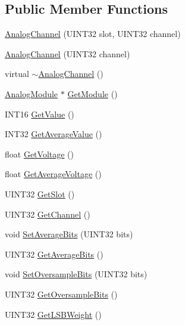 \subsection*{\-Public \-Member \-Functions}
\begin{DoxyCompactItemize}
\item 
\hyperlink{classAnalogChannel_a8e6754f11b6515e0cb61cf43c6ed9f0c}{\-Analog\-Channel} (\-U\-I\-N\-T32 slot, \-U\-I\-N\-T32 channel)
\item 
\hyperlink{classAnalogChannel_a9596b1752bb22dcb1295c2158042ec76}{\-Analog\-Channel} (\-U\-I\-N\-T32 channel)
\item 
virtual \hyperlink{classAnalogChannel_aab41f5e25b1a9a8fa1b935783dcc89a1}{$\sim$\-Analog\-Channel} ()
\item 
\hyperlink{classAnalogModule}{\-Analog\-Module} $\ast$ \hyperlink{classAnalogChannel_aa8c8f0328ba7a4074d0f8c8fe8738327}{\-Get\-Module} ()
\item 
\-I\-N\-T16 \hyperlink{classAnalogChannel_ab9d814ee9f311c6beb2b379e60aee79a}{\-Get\-Value} ()
\item 
\-I\-N\-T32 \hyperlink{classAnalogChannel_a35dda9856d45c0fe807337ab3678b212}{\-Get\-Average\-Value} ()
\item 
float \hyperlink{classAnalogChannel_a8032c882a142a01c43ea16c817fc2290}{\-Get\-Voltage} ()
\item 
float \hyperlink{classAnalogChannel_aba0ed352ce011170556c039c939f8731}{\-Get\-Average\-Voltage} ()
\item 
\-U\-I\-N\-T32 \hyperlink{classAnalogChannel_a2c2a990443b12be6cf86e9900d43b0ec}{\-Get\-Slot} ()
\item 
\-U\-I\-N\-T32 \hyperlink{classAnalogChannel_a5d191a8fb04536a9c20355e6e5b97262}{\-Get\-Channel} ()
\item 
void \hyperlink{classAnalogChannel_a64da26075ace6b51c635ed4b0646742b}{\-Set\-Average\-Bits} (\-U\-I\-N\-T32 bits)
\item 
\-U\-I\-N\-T32 \hyperlink{classAnalogChannel_ab73e958a37fece26e7dd9fd3c358684e}{\-Get\-Average\-Bits} ()
\item 
void \hyperlink{classAnalogChannel_a69c5b8dd70a0a5792f2522b2b4758fc3}{\-Set\-Oversample\-Bits} (\-U\-I\-N\-T32 bits)
\item 
\-U\-I\-N\-T32 \hyperlink{classAnalogChannel_ae7ddc6516b2ecba8d1e9b9abab9a5939}{\-Get\-Oversample\-Bits} ()
\item 
\-U\-I\-N\-T32 \hyperlink{classAnalogChannel_a6a491e56a5d92d4400bf7bde40eda2cc}{\-Get\-L\-S\-B\-Weight} ()
\item 

\end{DoxyCompactItemize}
